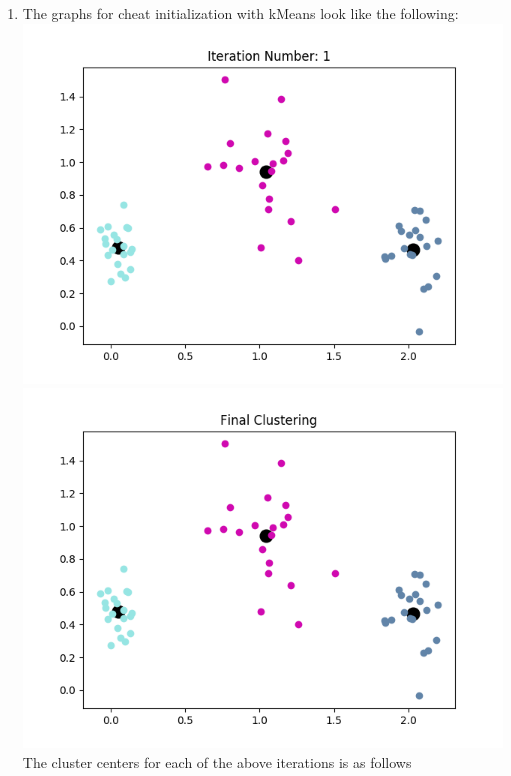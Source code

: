 \documentclass[11pt]{article}
\begin{document}
\begin{enumerate}
\item 
The graphs for cheat initialization with kMeans look like the following: \newline
\includegraphics[scale=0.4]{means_cheat_1.png}
\includegraphics[scale=0.4]{means_cheat_final.png} \newline
The cluster centers for each of the above iterations is as follows
\begin{center}
\end{center}


\end{enumerate}
\end{document}

